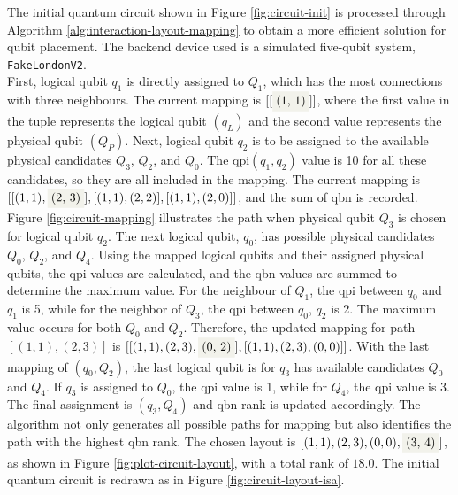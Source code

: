 \begin{example} %
The initial quantum circuit shown in Figure \ref{fig:circuit-init} is processed through Algorithm \ref{alg:interaction-layout-mapping}  to obtain a more efficient solution for qubit placement. The backend device used is a simulated five-qubit system, \lstinline{FakeLondonV2}. \\
First, logical qubit $q_1$ is directly assigned to $Q_1$, which has the most connections with three neighbours. The current mapping is $[[\colorbox{backcolour}{(1, 1)}]]$, where the first value in the tuple represents the logical qubit $(q_L)$ and the second value represents the physical qubit $(Q_P)$. Next, logical qubit $q_2$ is to be assigned to the available physical candidates $Q_3$, $Q_2$, and $Q_0$. The \acrshort{qpi}$(q_1, q_2)$ value is 10 for all these candidates, so they are all included in the mapping. The current mapping is $[[(1, 1), \colorbox{backcolour}{(2, 3)}], [(1, 1), (2, 2)], [(1, 1), (2, 0)]]$, and the sum of \acrshort{qbn} is recorded. Figure \ref{fig:circuit-mapping} illustrates the path when physical qubit $Q_3$ is chosen for logical qubit $q_2$. The next logical qubit, $q_0$, has possible physical candidates $Q_0$, $Q_2$, and $Q_4$. Using the mapped logical qubits and their assigned physical qubits, the \acrshort{qpi} values are calculated, and the \acrshort{qbn} values are summed to determine the maximum value. For the neighbour of $Q_1$, the \acrshort{qpi} between $q_0$ and $q_1$ is 5, while for the neighbor of $Q_3$, the \acrshort{qpi} between $q_0$, $q_2$ is 2. The maximum value occurs for both $Q_0$ and $Q_2$. Therefore, the updated mapping for path $[(1, 1), (2, 3)]$ is $[[(1, 1), (2, 3), \colorbox{backcolour}{(0, 2)}], [(1, 1), (2, 3), (0, 0)]]$. With the last mapping of $(q_0, Q_2)$, the last logical qubit is for $q_3$ has available candidates $Q_0$ and $Q_4$. If $q_3$ is assigned to $Q_0$, the \acrshort{qpi} value is 1, while for $Q_4$, the \acrshort{qpi} value is 3. The final assignment is $(q_3, Q_4)$ and \acrshort{qbn} rank is updated accordingly. The algorithm not only generates all possible paths for mapping but also identifies the path with the highest \acrshort{qbn} rank. The chosen layout is $[(1, 1), (2, 3), (0, 0), \colorbox{backcolour}{(3, 4)}]$, as shown in Figure \ref{fig:plot-circuit-layout}, with a total rank of $18.0$. The initial quantum circuit is redrawn as in Figure \ref{fig:circuit-layout-isa}.
\end{example}

